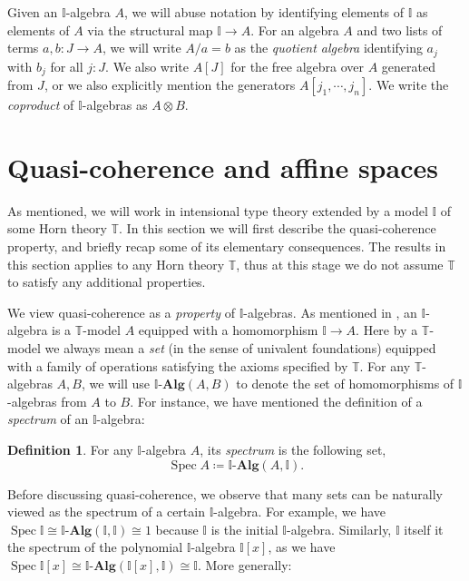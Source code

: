 \documentclass[12pt]{amsart}
\theoremstyle{definition}
\newtheorem{definition}[theorem]{Definition}
\newcommand{\mb}[1]{\mathbf{#1}}
\newcommand{\mbb}[1]{\mathbb{#1}}
\newcommand{\T}{\mbb T}
\newcommand{\I}{\mbb I}
\newcommand{\alg}{\text{-}\mb{Alg}}
\newcommand{\spec}{\operatorname{Spec}}
\begin{document}
Given an $\I$-algebra $A$, we will abuse notation by identifying elements of $\I$ as elements of $A$ via the structural map $\I \to A$. For an algebra $A$ and two lists of terms $a,b \colon J \to A$, 
we will write $A/a = b$ as the \emph{quotient algebra} identifying $a_j$ with $b_j$ for all $j : J$. We also write $A[J]$ for the free algebra over $A$ generated from $J$, or we also explicitly mention the generators $A[j_1,\cdots,j_n]$. We write the \emph{coproduct} of $\I$-algebras as $A \otimes B$.

\section{Quasi-coherence and affine spaces}\label{sec:basics}

As mentioned, we will work in intensional type theory extended by a model $\I$ of some Horn theory $\T$. In this section we will first describe the quasi-coherence property, and briefly recap some of its elementary consequences. The results in this section applies to any Horn theory $\T$, thus at this stage we do not assume $\T$ to satisfy any additional properties.

We view quasi-coherence as a \emph{property} of $\I$-algebras. As mentioned in , an $\I$-algebra is a $\T$-model $A$ equipped with a homomorphism $\I \to A$. Here by a $\T$-model we always mean a \emph{set} (in the sense of univalent foundations) equipped with a family of operations satisfying the axioms specified by $\T$. For any $\T$-algebras $A,B$, we will use $\I\alg(A,B)$ to denote the set of homomorphisms of $\I$-algebras from $A$ to $B$. For instance, we have mentioned the definition of a \emph{spectrum} of an $\I$-algebra: 

\begin{definition}
  For any $\I$-algebra $A$, its \emph{spectrum} is the following set,
  \[ \spec A \coloneq \I\alg(A,\I). \]
\end{definition}

Before discussing quasi-coherence, we observe that many sets can be naturally viewed as the spectrum of a certain $\I$-algebra. For example, we have $\spec \I \cong \I\alg(\I,\I) \cong 1$ because  $\I$ is the initial $\I$-algebra. Similarly, $\I$ itself it the spectrum of the polynomial $\I$-algebra $\I[x]$, as we have $\spec \I[x] \cong \I\alg(\I[x],\I) \cong \I$. More generally:
\end{document}
